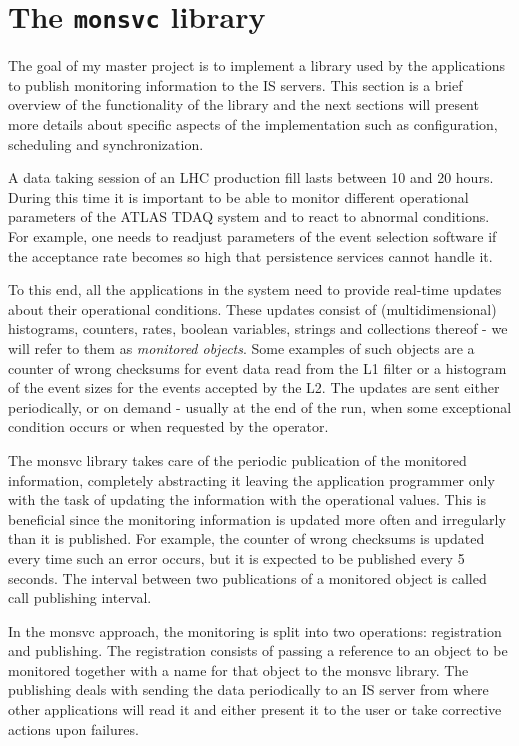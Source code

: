 \chapter{The {\tt monsvc} library} %
\label{Capitolul2}

The goal of my master project is to implement a library used by the applications to publish monitoring information to the IS servers. This section is a brief overview of the functionality of the library and the next sections will present more details about specific aspects of the implementation such as configuration, scheduling and synchronization.

A data taking session of an LHC production fill lasts between 10 and 20 hours. During this time it is important to be able to monitor different operational parameters of the ATLAS TDAQ system and to react to abnormal conditions. For example, one needs to readjust parameters of the event selection software if the acceptance rate becomes so high that persistence services cannot handle it. 

To this end, all the applications in the system need to provide real-time updates about their operational conditions. These updates consist of (multidimensional) histograms, counters, rates, boolean variables, strings and collections thereof - we will refer to them as \emph{monitored objects}. Some examples of such objects are a counter of wrong checksums for event data read from the L1 filter or a histogram of the event sizes for the events accepted by the L2. The updates are sent either periodically, or on demand - usually at the end of the run, when some exceptional condition occurs or when requested by the operator.

The monsvc library takes care of the periodic publication of the monitored information, completely abstracting it leaving the application programmer only with the task of updating the information with the operational values. This is beneficial since the monitoring information is updated more often and irregularly than it is published. For example, the counter of wrong checksums is updated every time such an error occurs, but it is expected to be published every 5 seconds. The interval between two publications of a monitored object is called call publishing interval.

In the monsvc approach, the monitoring is split into two operations: registration and publishing. The registration consists of passing a reference to an object to be monitored together with a name for that object to the monsvc library. The publishing deals with sending the data periodically to an IS server from where other applications will read it and either present it to the user or take corrective actions upon failures. 

